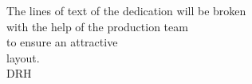 \thispagestyle{empty}
\begin{center}The lines of text of the dedication will be broken\\ 
with the help of the production team\\ 
to ensure an attractive\\
layout.\\[1ex] 
DRH
\end{center}
